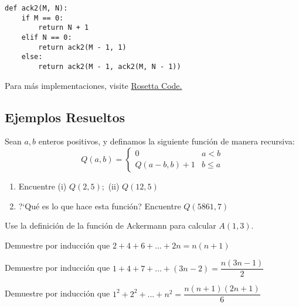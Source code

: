 \begin{lstlisting}[caption=python, caption=Implentación recursiva de \emph{Ackermann} en \texttt{Python}]
def ack2(M, N):
	if M == 0:
		return N + 1
	elif N == 0:
		return ack2(M - 1, 1)
	else:
		return ack2(M - 1, ack2(M, N - 1))
\end{lstlisting}

Para más implementaciones, visite \href{http://rosettacode.org/wiki/Ackermann\_function}{Rosetta Code.}


\subsection{Ejemplos Resueltos}


	\begin{problema}
		Sean $a,b$ enteros positivos, y definamos la siguiente función de manera recursiva:
		$$
		Q(a,b)=
		\begin{cases}
			0 & a<b \\
			Q(a-b,b)+1 & b \leq a
		\end{cases}
		$$
		\begin{enumerate}
			\item Encuentre (i) $Q(2,5);$ (ii) $Q(12,5)$
			\item ?`Qu\'e es lo que hace esta función? Encuentre $Q(5861,7)$
		\end{enumerate}
	\end{problema}



	\begin{problema}
		Use la definición de la función de Ackermann para calcular $A(1,3).$
	\end{problema}



	\begin{problema}
		Demuestre por inducción que 
		$\displaystyle 2+4+6+...+2n=n(n+1)$
	\end{problema}



	\begin{problema}
		Demuestre por inducción que 
		$\displaystyle 1+4+7+...+\left( 3n-2 \right)=\dfrac{n\left( 3n-1 \right)}{2}$
	\end{problema}



	\begin{problema}
		Demuestre por inducción que 
		$\displaystyle 1^{2}+2^{2}+...+n^{2}=\dfrac{n(n+1)(2n+1)}{6}$
	\end{problema}



